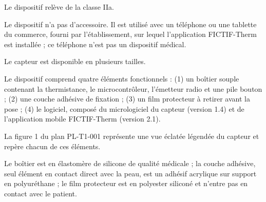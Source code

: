 \documentclass[11pt,a4paper]{article}
\begin{document}
\par{}\par

{\small Le dispositif relève de la classe IIa.}\par

\par{}\par

{\small Le dispositif n'a pas d'accessoire. Il est utilisé avec un téléphone ou une tablette du commerce, fourni par l'établissement, sur lequel l'application FICTIF-Therm est installée ; ce téléphone n'est pas un dispositif médical.}\par

\par{}\par

{\small Le capteur est disponible en plusieurs tailles.}\par

\par{}\par

{\small Le dispositif comprend quatre éléments fonctionnels : (1) un boîtier souple contenant la thermistance, le microcontrôleur, l'émetteur radio et une pile bouton ; (2) une couche adhésive de fixation ; (3) un film protecteur à retirer avant la pose ; (4) le logiciel, composé du micrologiciel du capteur (version 1.4) et de l'application mobile FICTIF-Therm (version 2.1).}\par

{\small La figure 1 du plan PL-T1-001 représente une vue éclatée légendée du capteur et repère chacun de ces éléments.}\par

\par{}\par

{\small Le boîtier est en élastomère de silicone de qualité médicale ; la couche adhésive, seul élément en contact direct avec la peau, est un adhésif acrylique sur support en polyuréthane ; le film protecteur est en polyester siliconé et n'entre pas en contact avec le patient.}\par

\par{}\par
\end{document}
